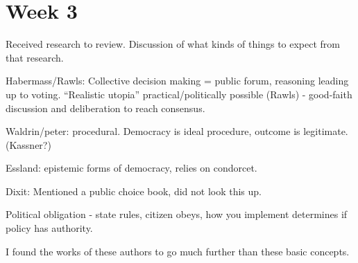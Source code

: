 
\section{Week 3}

Received research to review.  Discussion of what kinds of things to expect from that research.

Habermass/Rawls:  Collective decision making = public forum, reasoning leading up to voting. ``Realistic utopia'' practical/politically possible (Rawls) - good-faith discussion and deliberation to reach consensus.

Waldrin/peter: procedural.  Democracy is ideal procedure, outcome is legitimate. (Kassner?)

Essland: epistemic forms of democracy, relies on condorcet.

Dixit: Mentioned a public choice book, did not look this up.

Political obligation - state rules, citizen obeys, how you implement determines if policy has authority.

I found the works of these authors to go much further than these basic concepts.
